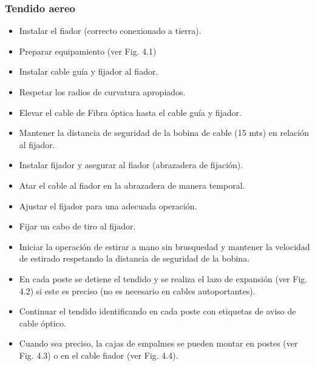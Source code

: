 \documentclass[12pt,letterpaper]{article}
\begin{document}
\subsubsection{Tendido aereo}
\begin{itemize}
    \item Instalar el fiador (correcto conexionado a tierra).
    \item Preparar equipamiento (ver Fig. 4.1)
    \item Instalar cable guía y fijador al fiador.
    \item Respetar los radios de curvatura apropiados.
    \item Elevar el cable de Fibra óptica hasta el cable guía y fijador.
    \item Mantener la distancia de seguridad de la bobina de cable (15 mts) en relación al fijador.
    \item Instalar fijador y asegurar al fiador (abrazadera de fijación).
    \item Atar el cable al fiador en la abrazadera de manera temporal.
    \item Ajustar el fijador para una adecuada operación.
    \item Fijar un cabo de tiro al fijador.
    \item Iniciar la operación de estirar a mano sin brusquedad y mantener la velocidad de estirado respetando la distancia de seguridad de la bobina.
    \item En cada poste se detiene el tendido y se realiza el lazo de expansión (ver Fig. 4.2) si este es preciso (no es necesario en cables autoportantes).
    \item Continuar el tendido identificando en cada poste con etiquetas de aviso de cable óptico.
    \item Cuando sea preciso, la cajas de empalmes se pueden montar en postes (ver Fig. 4.3) o en el cable fiador (ver Fig. 4.4).
\end{itemize}
\end{document}
